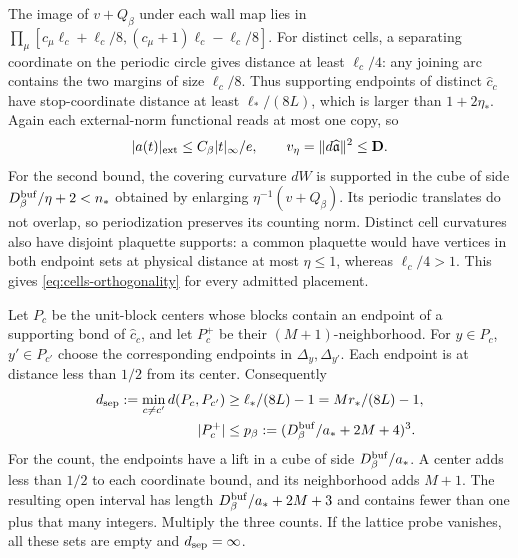 The image of $v+Q_\beta$ under each wall map
lies in
$\prod_\mu[c_\mu\ell_c+\ell_c/8,(c_\mu+1)\ell_c-\ell_c/8]$.
For distinct cells, a separating coordinate
on the periodic circle gives distance
at least $\ell_c/4$: any joining arc
contains the two margins of size $\ell_c/8$.
Thus supporting endpoints of distinct
$\widehat c_c$ have stop-coordinate distance
at least $\ell_*/(8L)$, which is larger
than $1+2\eta_*$. Again each external-norm
functional reads at most one copy, so
\begin{equation}\label{eq:interacting-external-probe-bound}
 |a(t)|_{\rm ext}\le C_\beta|t|_\infty/e,\qquad
                 v_\eta=\|d\widehat{\mathfrak a}\|^2\le\mathbf D.
\end{equation}
For the second bound, the covering curvature
$dW$ is supported in the cube of side
$D_\beta^{\rm buf}/\eta+2<n_*$
obtained by enlarging $\eta^{-1}(v+Q_\beta)$.
Its periodic translates do not overlap,
so periodization preserves its counting
norm. Distinct cell curvatures also have
disjoint plaquette supports: a common
plaquette would have vertices in both
endpoint sets at physical distance at
most $\eta\le1$, whereas $\ell_c/4>1$.
This gives \eqref{eq:cells-orthogonality}
for every admitted placement.

Let $P_c$ be the unit-block centers whose
blocks contain an endpoint of a supporting
bond of $\widehat c_c$, and let $P_c^+$
be their $(M+1)$-neighborhood.
For $y\in P_c$, $y'\in P_{c'}$ choose the
corresponding endpoints in $\Delta_y,\Delta_{y'}$.
Each endpoint is at distance less than $1/2$
from its center. Consequently
\begin{align}
 d_{\rm sep}:=\min_{c\ne c'}d(P_c,P_{c'})
    &\ge\ell_*/(8L)-1=Mr_*/(8L)-1,
                              \label{eq:interacting-probe-separation}\\
 |P_c^+|&\le p_\beta:=
                  (D_\beta^{\rm buf}/a_*+2M+4)^3 .
                              \label{eq:interacting-support-number}
\end{align}
For the count, the endpoints have a lift in
a cube of side $D_\beta^{\rm buf}/a_*$.
A center adds less than $1/2$ to each
coordinate bound, and its neighborhood adds
$M+1$. The resulting open interval has
length $D_\beta^{\rm buf}/a_*+2M+3$
and contains fewer than one plus that
many integers. Multiply the three counts.
If the lattice probe vanishes, all these
sets are empty and $d_{\rm sep}=\infty$.

